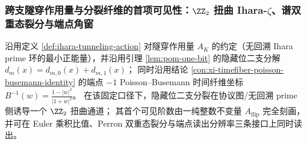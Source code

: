 \subsubsection{跨支隧穿作用量与分裂纤维的首项可见性：\texorpdfstring{$\ZZ_2$}{Z/2} 扭曲 Ihara-\texorpdfstring{$\zeta$}{zeta}、谱双重态裂分与端点角窗}
沿用定义 \ref{def:ihara-tunneling-action} 对隧穿作用量 \(A_K\) 的约定（无回溯 Ihara prime 环的最小正能量），并沿用引理 \ref{lem:pom-one-bit} 的隐藏位二支分解
\(
d_m(x)=d_{m,0}(x)+d_{m,1}(x)
\)；
同时沿用结论 \ref{con:xi-timefiber-poisson-busemann-identity} 的端点 \(-1\) Poisson--Busemann 时间纤维坐标
\(
B^{-1}(w)=\frac{1-|w|^2}{|1+w|^2}
\)。
在该固定口径下，隐藏位二支分裂在协议图/无回溯 prime 侧诱导一个 \(\ZZ_2\) 扭曲通道；
其首个可见阶数由一纯整数不变量 \(A_{\mathrm{flip}}\) 完全刻画，并可在 Euler 乘积比值、Perron 双重态裂分与端点读出分辨率三条接口上同时读出。

